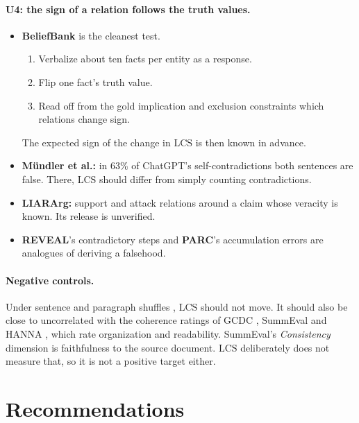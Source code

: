 \documentclass[10pt]{article}
\newcommand{\LCS}{\mathrm{LCS}}
\begin{document}
\paragraph{U4: the sign of a relation follows the truth values.}
\begin{itemize}
\item \textbf{BeliefBank} \citep{beliefbank,concord} is the cleanest test.
  \begin{enumerate}
  \item Verbalize about ten facts per entity as a response.
  \item Flip one fact's truth value.
  \item Read off from the gold implication and exclusion constraints which relations change sign.
  \end{enumerate}
  The expected sign of the change in $\LCS$ is then known in advance.
\item \textbf{Mündler et al.:} in 63\% of ChatGPT's self-contradictions both sentences are false.
  There, $\LCS$ should differ from simply counting contradictions.
\item \textbf{LIARArg:} support and attack relations around a claim whose veracity is known. Its
  release is unverified.
\item \textbf{REVEAL}'s contradictory steps and \textbf{PARC}'s accumulation errors \citep{parc}
  are analogues of deriving a falsehood.
\end{itemize}

\paragraph{Negative controls.} Under sentence and paragraph shuffles \citep{barzilay}, $\LCS$ should
not move. It should also be close to uncorrelated with the coherence ratings of GCDC \citep{gcdc},
SummEval \citep{summeval} and HANNA \citep{hanna}, which rate organization and readability.
SummEval's \emph{Consistency} dimension is faithfulness to the source document. $\LCS$ deliberately
does not measure that, so it is not a positive target either.

\section{Recommendations}
\end{document}
